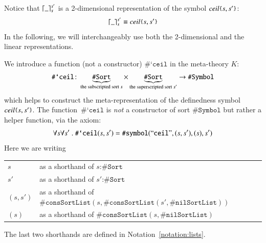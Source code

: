 \documentclass[UTF8,11pt]{article}
\theoremstyle{plain}
\theoremstyle{definition}
\theoremstyle{remark}
\DeclarePairedDelimiter{\ceil}{\lceil}{\rceil}
\newcommand{\cln}{\texttt{:}}
\newcommand{\itceil}{\textit{ceil}}
\newcommand{\parametric}[2]{{#1}\raisebox{.2ex}{\texttt{\footnotesize{\{}}}#2\raisebox{.2ex}{\texttt{\footnotesize{\}}}}}
\newcommand{\sharpsymbol}{\#}
\newcommand{\KSort}{\texttt{\sharpsymbol Sort}}
\newcommand{\KSymbol}{\texttt{\sharpsymbol Symbol}}
\newcommand{\Ksymbol}{\texttt{\sharpsymbol symbol}}
\newcommand{\KSymbolceil}{\texttt{\sharpsymbol `ceil}}
\newcommand{\KnilKSortList}{\texttt{\sharpsymbol nilSortList}}
\newcommand{\KconsKSortList}{\texttt{\sharpsymbol consSortList}}
\newcommand{\qquottt}[1]{\textrm{``\texttt{#1}''}}
\begin{document}
Notice that $\ceil{\_}_s^{s'}$ is a 2-dimensional representation of the symbol
$\parametric{\itceil}{s,s'}$:
$$ \ceil{\_}_s^{s'} \equiv \parametric{\itceil}{s,s'} $$
In the following, we will interchangeably use both the 2-dimensional
and the linear representations.

We introduce a function (not a constructor) $\KSymbolceil$ in the meta-theory
$K$:
\begin{equation*}
 \KSymbolceil \colon
 \underbrace{\KSort}_\text{the subscripted sort $s$}
 \times
 \underbrace{\KSort}_\text{the superscripted sort $s'$} \to \KSymbol \\
\end{equation*}
which helps to construct the meta-representation of the definedness symbol
$\parametric{\itceil}{s,s'}$.
The function~$\KSymbolceil$ is \emph{not} a constructor of sort $\KSymbol$ but
rather a helper function, via the axiom:
\begin{equation*}
 \forall s \forall s' \ .\ \KSymbolceil(s, s') = \Ksymbol(\qquottt{ceil}, (s,s'),
 (s), s')
\end{equation*}
Here we are writing
\begin{center}
\begin{tabular}{ll}
 $s$ & as a shorthand of $s \cln \KSort$ \\
 $s'$ & as a shorthand of $s' \cln \KSort$ \\
    $(s,s')$ & as a shorthand of
    $\KconsKSortList(s,\KconsKSortList(s',\KnilKSortList))$ \\
    $(s)$ & as a shorthand of $\KconsKSortList(s,\KnilKSortList)$
\end{tabular}
\end{center}
The last two shorthands are defined in Notation~\ref{notation:lists}.
\end{document}
